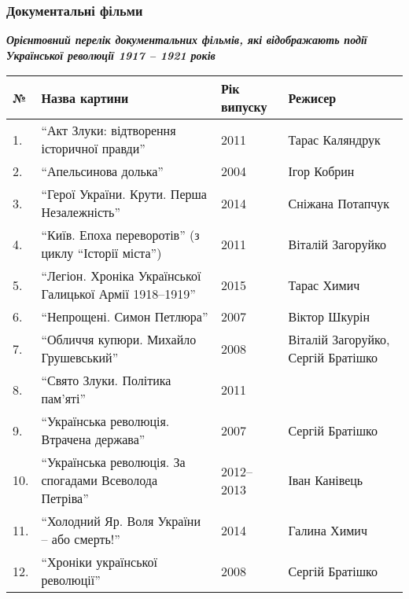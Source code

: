  
 
 
 
 

\subsubsection{Документальні фільми}

\textbf{\em Орієнтовний перелік документальних фільмів, які відображають події Української
революції 1917 – 1921 років}

\begin{center}
\begin{longtable}{|l|p{8cm}|p{1cm}|p{5cm}|}
\hline
\textbf{№} & \textbf{Назва картини} & \textbf{Рік випуску} & \textbf{Режисер} \\
\hline
1. & \enquote{Акт Злуки: відтворення історичної правди} & 2011 & Тарас Каляндрук \\
\hline
2. & \enquote{Апельсинова долька} & 2004 & Ігор Кобрин \\
\hline
3. & \enquote{Герої України. Крути. Перша Незалежність} & 2014 & Сніжана Потапчук \\
\hline
4. & \enquote{Київ. Епоха переворотів} (з циклу \enquote{Історії міста}) & 2011 & Віталій Загоруйко \\
\hline
5. & \enquote{Легіон. Хроніка Української Галицької Армії 1918–1919} & 2015 & Тарас Химич \\
\hline
6. & \enquote{Непрощені. Симон Петлюра} & 2007 & Віктор Шкурін \\
\hline
7. & \enquote{Обличчя купюри. Михайло Грушевський} & 2008 & Віталій Загоруйко, Сергій Братішко \\
\hline
8. & \enquote{Свято Злуки. Політика пам'яті} & 2011 & \\
\hline
9. & \enquote{Українська революція. Втрачена держава} & 2007 & Сергій Братішко \\
\hline
10. & \enquote{Українська революція. За спогадами Всеволода Петріва} & 2012–2013 & Іван Канівець \\
\hline
11. & \enquote{Холодний Яр. Воля України – або смерть!} & 2014 & Галина Химич \\
\hline
12. & \enquote{Хроніки української революції} & 2008 & Сергій Братішко \\
\hline
\end{longtable}
\end{center}
